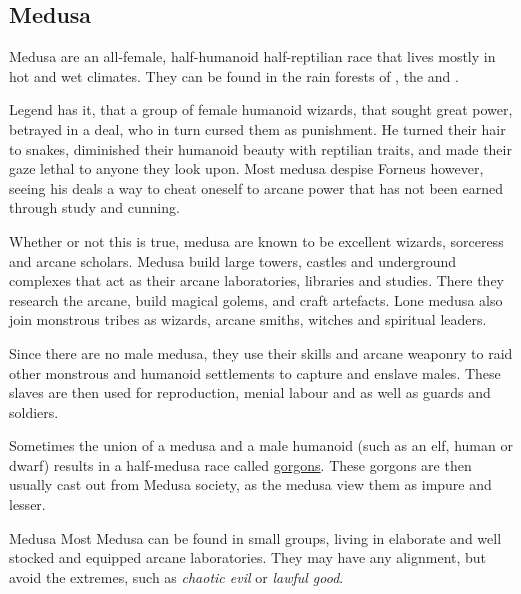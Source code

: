 \subsection{Medusa}
\label{sec:Medusa}

Medusa are an all-female, half-humanoid half-reptilian race that lives
mostly in hot and wet climates. They can be found in the rain forests of
, the  and .

Legend has it, that a group of female humanoid wizards, that sought great
power, betrayed  in a deal, who in turn cursed them as
punishment. He turned their hair to snakes, diminished their humanoid beauty
with reptilian traits, and made their gaze lethal to anyone they look upon.
Most medusa despise Forneus however, seeing his deals a way to cheat oneself
to arcane power that has not been earned through study and cunning.

Whether or not this is true, medusa are known to be excellent wizards,
sorceress and arcane scholars. Medusa build large towers, castles and
underground complexes that act as their arcane laboratories, libraries and
studies. There they research the arcane, build magical golems, and craft
artefacts. Lone medusa also join monstrous tribes as wizards, arcane smiths,
witches and spiritual leaders.

Since there are no male medusa, they use their skills and arcane weaponry
to raid other monstrous and humanoid settlements to capture and enslave
males. These slaves are then used for reproduction, menial labour and
as well as guards and soldiers.

Sometimes the union of a medusa and a male humanoid (such as an elf, human or
dwarf) results in a half-medusa race called \hyperref[sec:Gorgons]{gorgons}.
These gorgons are then usually cast out from Medusa society, as the medusa
view them as impure and lesser.

\begin{35e}{Medusa}
  Most Medusa can be found in small groups, living in elaborate and well
  stocked and equipped arcane laboratories. They may have any alignment, but
  avoid the extremes, such as \emph{chaotic evil} or \emph{lawful good}.
\end{35e}
